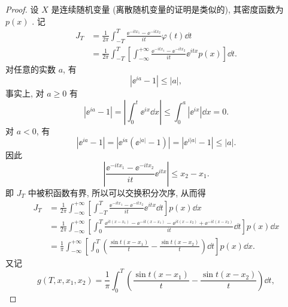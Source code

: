 \begin{proof}
    设 $ X $ 是连续随机变量 (离散随机变量的证明是类似的), 其密度函数为 $ p (x) $ .
    记
    \begin{align*}
        J_T & = \frac{1}{2\pi} \int_{-T}^T \frac{\ee^{-itx_1}  - \ee^{-itx_2}}{it} \varphi (t) \dd t\\
        & = \frac{1}{2\pi} \int_{-T}^T \left[ \int_{-\infty}^{+\infty} \frac{\ee^{-itx_1}  - \ee^{-itx_2}}{it} \ee^{itx} p (x) \right] \dd t.
    \end{align*}
    对任意的实数 $ a $, 有
    \begin{equation*}
        \left\lvert \ee^{ia} -1 \right\rvert \leq \lvert a \rvert,
    \end{equation*}
    事实上, 对 $ a \geq 0 $ 有
    \begin{equation*}
        \left\lvert \ee^{ia} - 1 \right\rvert = \left\lvert \int_0^t \ee^{ix} \dd x \right\rvert \leq \int_0^a \left\lvert \ee^{ix} \right\rvert \dd x = 0.
    \end{equation*}
    对 $ a < 0 $, 有
    \begin{equation*}
        \left\lvert \ee^{ia} - 1 \right\rvert = \left\lvert \ee^{ia} \left( \ee^{\lvert a \rvert} - 1 \right) \right\rvert = \left\lvert \ee^{i \lvert a \rvert} - 1 \right\rvert \leq \lvert a \rvert.
    \end{equation*}
    因此
    \begin{equation*}
        \left\lvert \frac{\ee^{-itx_1} - \ee^{-itx_2}}{it} \ee^{itx} \right\rvert \leq x_2 - x_1.
    \end{equation*}
    即 $ J_T $ 中被积函数有界, 所以可以交换积分次序, 从而得
    \begin{align*}
        J_T & = \frac{1}{2\pi} \int_{-\infty}^{+\infty} \left[ \int_{-T}^{T} \frac{\ee^{-itx_1} - \ee^{-itx_2}}{it} \ee^{itx} \dd t \right] p (x) \dd x\\
        & = \frac{1}{2\pi} \int_{-\infty}^{+\infty} \left[ \int_{0}^{T} \frac{\ee^{it(x - x_1)} - \ee^{-it (x - x_1)} - \ee^{it (x - x_2)} + \ee^{-it (x - x_2)}}{it} \dd t \right] p (x) \dd x\\
        & = \frac{1}{\pi} \int_{-\infty}^{+\infty} \left[ \int_{0}^{T} \left(\frac{\sin t (x - x_1)}{t} - \frac{\sin t (x - x_2)}{t} \right) \dd t \right] p (x) \dd x.
    \end{align*}
    又记
    \begin{equation*}
        g (T, x, x_1, x_2) = \frac{1}{\pi} \int_{0}^{T} \left(\frac{\sin t (x - x_1)}{t} - \frac{\sin t (x - x_2)}{t} \right) \dd t,

\end{equation*}
\end{proof}
